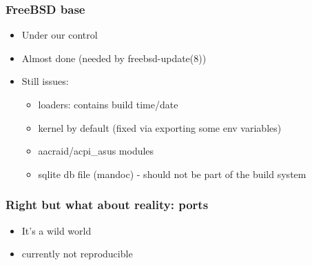 \begin{frame}
	\frametitle{FreeBSD base}
	\begin{itemize}
		\item Under our control
			\pause
		\item Almost done (needed by freebsd-update(8))
			\pause
		\item Still issues:
			\begin{itemize}
					\pause
				\item loaders: contains build time/date
					\pause
				\item kernel by default (fixed via exporting some env variables)
					\pause
				\item aacraid/acpi\_asus modules
					\pause
				\item sqlite db file (mandoc) - should not be part of the build system
			\end{itemize}
	\end{itemize}
\end{frame}

\begin{frame}
	\frametitle{Right but what about reality: ports}
	\begin{itemize}
			\pause
		\item It's a wild world
			\pause
		\item currently not reproducible
	\end{itemize}
	\pause
\end{frame}

